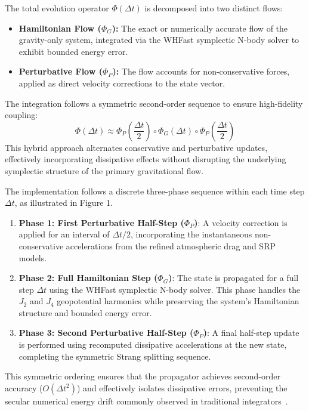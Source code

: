 \documentclass[letterpaper,11pt]{AAS}
\begin{document}
The total evolution operator $\Phi(\Delta t)$ is decomposed into two distinct flows:
\begin{itemize}
    \item \textbf{Hamiltonian Flow ($\Phi_G$):} The exact or numerically accurate flow of the gravity-only system, integrated via the WHFast symplectic N-body solver to exhibit bounded energy error.
    \item \textbf{Perturbative Flow ($\Phi_P$):} The flow accounts for non-conservative forces, applied as direct velocity corrections to the state vector.
\end{itemize}

The integration follows a symmetric second-order sequence to ensure high-fidelity coupling:
\begin{equation}
    \Phi(\Delta t) \approx \Phi_{P}\left(\frac{\Delta t}{2}\right) \circ \Phi_{G}(\Delta t) \circ \Phi_{P}\left(\frac{\Delta t}{2}\right)
\end{equation}
This hybrid approach alternates conservative and perturbative updates, effectively incorporating dissipative effects without disrupting the underlying symplectic structure of the primary gravitational flow.

The implementation follows a discrete three-phase sequence within each time step $\Delta t$, as illustrated in Figure 1. 
\begin{enumerate}
    \item \textbf{Phase 1: First Perturbative Half-Step ($\Phi_P$)}: A velocity correction is applied for an interval of $\Delta t/2$, incorporating the instantaneous non-conservative accelerations from the refined atmospheric drag and SRP models.
    \item \textbf{Phase 2: Full Hamiltonian Step ($\Phi_G$)}: The state is propagated for a full step $\Delta t$ using the WHFast symplectic N-body solver. This phase handles the $J_2$ and $J_4$ geopotential harmonics while preserving the system's Hamiltonian structure and bounded energy error.
    \item \textbf{Phase 3: Second Perturbative Half-Step ($\Phi_P$)}: A final half-step update is performed using recomputed dissipative accelerations at the new state, completing the symmetric Strang splitting sequence.
\end{enumerate}
This symmetric ordering ensures that the propagator achieves second-order accuracy ($O(\Delta t^2)$) and effectively isolates dissipative errors, preventing the secular numerical energy drift commonly observed in traditional integrators~\cite{tamayo_reboundx_2020}.
\end{document}
